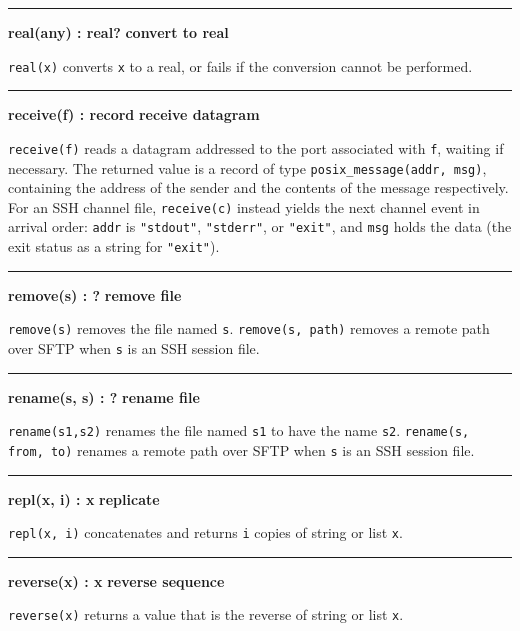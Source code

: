 \bigskip\hrule\vspace{0.1cm}
\noindent
{\bf real(any) : real? } \hfill {\bf convert to real}

\noindent
{}\texttt{real(x)} converts \texttt{x} to a real,
or fails if the conversion cannot be performed.

\bigskip\hrule\vspace{0.1cm}
\noindent
{\bf receive(f) : record } \hfill {\bf receive datagram}

\noindent
{}\texttt{receive(f)} reads a datagram addressed
to the port associated with \texttt{f}, waiting if necessary. The
returned value is a record of type \texttt{posix\_message(addr, msg)},
containing the address of the sender and the contents of the message
respectively. For an SSH channel file, \texttt{receive(c)} instead
yields the next channel event in arrival order: \texttt{addr} is
\texttt{"stdout"}, \texttt{"stderr"}, or \texttt{"exit"}, and
\texttt{msg} holds the data (the exit status as a string for
\texttt{"exit"}).

\bigskip\hrule\vspace{0.1cm}
\noindent
{\bf remove(s) : ? } \hfill {\bf remove file}

\noindent
{}\texttt{remove(s)} removes the
file named \texttt{s}. \texttt{remove(s, path)} removes a remote path
over SFTP when \texttt{s} is an SSH session file.

\bigskip\hrule\vspace{0.1cm}
\noindent
{\bf rename(s, s) : ? } \hfill {\bf rename file}

\noindent
{}\texttt{rename(s1,s2)} renames the file named
\texttt{s1} to have the name \texttt{s2}. \texttt{rename(s, from, to)}
renames a remote path over SFTP when \texttt{s} is an SSH session file.

\bigskip\hrule\vspace{0.1cm}
\noindent
{\bf repl(x, i) : x } \hfill {\bf replicate}

\noindent
{}\texttt{repl(x, i)} concatenates and returns
\texttt{i} copies of string or list \texttt{x}.

\bigskip\hrule\vspace{0.1cm}
\noindent
{\bf reverse(x) : x } \hfill {\bf reverse sequence}

\noindent
{}\texttt{reverse(x)} returns a value that is the
reverse of string or list \texttt{x}.

